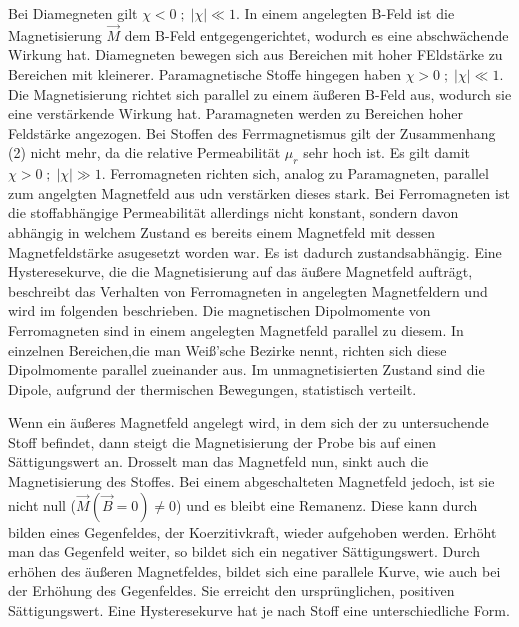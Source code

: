 Bei Diamegneten gilt $\chi <0\; ; \;|\chi|\ll 1$. In einem angelegten B-Feld ist die Magnetisierung $\vec M$ dem B-Feld entgegengerichtet, wodurch es
eine abschwächende Wirkung hat. Diamegneten bewegen sich aus Bereichen mit hoher FEldstärke zu Bereichen mit kleinerer.
Paramagnetische Stoffe hingegen haben $\chi > 0\; ; \;|\chi|\ll 1$. Die Magnetisierung richtet sich parallel zu einem äußeren B-Feld aus,
wodurch sie eine verstärkende Wirkung hat. Paramagneten werden zu Bereichen hoher Feldstärke angezogen.
Bei Stoffen des Ferrmagnetismus gilt der Zusammenhang (2) nicht mehr, da die relative Permeabilität $\mu_r$ sehr hoch ist. Es gilt damit
$\chi > 0\; ; \;|\chi|\gg 1$. Ferromagneten richten sich, analog zu Paramagneten, parallel zum angelgten Magnetfeld aus udn verstärken dieses
stark. 
Bei Ferromagneten ist die stoffabhängige Permeabilität allerdings nicht konstant, sondern davon abhängig in welchem Zustand es bereits
einem Magnetfeld mit dessen Magnetfeldstärke asugesetzt worden war. Es ist dadurch zustandsabhängig.
Eine Hysteresekurve, die die Magnetisierung auf das äußere Magnetfeld aufträgt, beschreibt das Verhalten von Ferromagneten in
angelegten Magnetfeldern und wird im folgenden beschrieben. Die magnetischen Dipolmomente von Ferromagneten sind in einem angelegten
Magnetfeld parallel zu diesem. In einzelnen Bereichen,die man Weiß'sche Bezirke nennt, richten sich diese Dipolmomente parallel zueinander aus.
Im unmagnetisierten Zustand sind die Dipole, aufgrund der thermischen Bewegungen, statistisch verteilt.




Wenn ein äußeres Magnetfeld angelegt wird, in dem sich der zu untersuchende Stoff befindet, dann steigt die Magnetisierung der Probe bis
auf einen Sättigungswert an. Drosselt man das Magnetfeld nun, sinkt auch die Magnetisierung des Stoffes. Bei einem abgeschalteten Magnetfeld jedoch,
ist sie nicht null ($\vec M(\vec B = 0)\neq0$) und es bleibt eine Remanenz.
Diese kann durch bilden eines Gegenfeldes, der Koerzitivkraft, wieder aufgehoben werden. Erhöht man das Gegenfeld weiter, so bildet sich ein 
negativer Sättigungswert.
Durch erhöhen des äußeren Magnetfeldes, bildet sich eine parallele Kurve, wie auch bei der Erhöhung des Gegenfeldes. Sie erreicht den
ursprünglichen, positiven Sättigungswert. Eine Hysteresekurve hat je nach Stoff eine unterschiedliche Form.



\cite{sample}